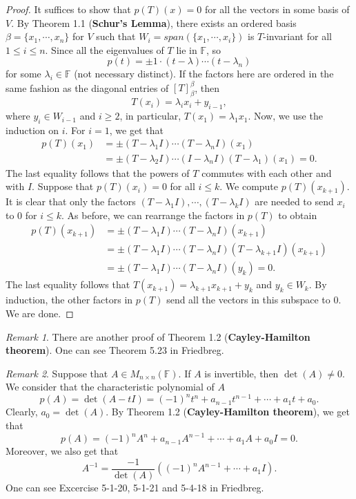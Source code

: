 \documentclass[12pt,reqno]{amsart}
\theoremstyle{plain}
\newcommand{\F}{\mathbb{F}}
\newcommand{\spanning}[1]{span(#1)}
\theoremstyle{remark}
\newtheorem*{remark}{Remark}
\begin{document}
\begin{proof}
	It suffices to show that $p(T)(x) =0$ for all the vectors in some basis of $V$. By Theorem 1.1 (\textbf{Schur's Lemma}), there exists an ordered basis $\beta = \{x_1,\cdots,x_n\}$ for $V$ such that  $W_i = \spanning{\{x_1,\cdots,x_i\}}$ is $T$-invariant for all $1 \leq i \leq n$. Since all the eigenvalues of $T$ lie in $\F$, so 
	$$p(t) = \pm1 \cdot (t - \lambda)\cdots(t-\lambda_n)$$
	for some $\lambda_i \in \F$ (not necessary distinct). If the factors here are ordered in the same fashion as the diagonal entries of $[T]^{\beta}_{\beta}$, then 
	$$T(x_i) = \lambda_ix_i+y_{i-1},$$ 
	where $y_i \in W_{i-1}$ and $i \geq 2$, in particular, $T(x_1) = \lambda_1x_1$. Now, we use the induction on $i$. For $i = 1$, we get that 
	\begin{align*}
		p(T)(x_1) 
		& = \pm(T - \lambda_1 I)\cdots(T - \lambda_n I)(x_1) \\
		& = \pm(T- \lambda_2 I)\cdots(I-\lambda_n I)(T - \lambda_1)(x_1) = 0.
	\end{align*}
	The last equality follows that the powers of $T$ commutes with each other and with $I$. Suppose that $p(T)(x_i)=0$ for all $i \leq k$. We compute $p(T)(x_{k+1})$. It is clear that only the factors $(T - \lambda_1 I),\cdots,(T - \lambda_k I)$ are needed to send $x_i$ to $0$ for $i \leq k$. As before, we can rearrange the factors in $p(T)$ to obtain
	\begin{align*}
		p(T)(x_{k+1})
		& = \pm(T - \lambda_1 I)\cdots(T - \lambda_n I)(x_{k+1}) \\
		& = \pm(T - \lambda_1 I)\cdots(T - \lambda_n I)(T - \lambda_{k+1}I)(x_{k+1}) \\
		& = \pm(T - \lambda_1 I)\cdots(T - \lambda_n I)(y_k) = 0.
	\end{align*}
 	The last equality follows that $T(x_{k+1}) = \lambda_{k+1}x_{k+1}+y_{k}$ and $y_k \in W_k$. By induction, the other factors in $p(T)$ send all the vectors in this subspace to 0. We are done.
\end{proof}

\begin{remark}
	There are another proof of Theorem 1.2 (\textbf{Cayley-Hamilton theorem}). One can see Theorem 5.23 in Friedbreg.
\end{remark}

\begin{remark}
	Suppose that $A \in M_{n \times n}(\F)$. If $A$ is invertible, then $\det(A) \ne 0$. We consider that the characteristic polynomial of $A$
	$$p(A) = \det(A - tI) = (-1)^nt^n + a_{n-1}t^{n-1}+\cdots+ a_1t + a_0.$$
	Clearly, $a_0 = \det(A)$. By Theorem 1.2 (\textbf{Cayley-Hamilton theorem}), we get that 
	$$p(A) = (-1)^nA^n + a_{n-1}A^{n-1}+\cdots+ a_1A + a_0I = 0.$$
	Moreover, we also get that 
	$$A^{-1} = \frac{-1}{\det(A)}((-1)^nA^{n-1} + \cdots+ a_1I).$$
	One can see Excercise 5-1-20, 5-1-21 and 5-4-18 in Friedbreg.
\end{remark}
\end{document}
